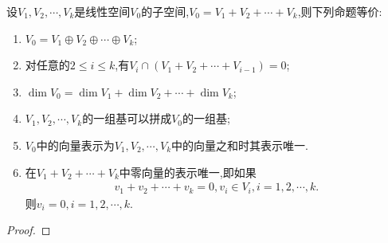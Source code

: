 \documentclass[../../main.tex]{subfiles}%
\begin{document}
\begin{theorem}[直和的等价条件]\label{theorem:直和的等价条件}
设\(V_1,V_2,\cdots,V_k\)是线性空间\(V_0\)的子空间,\(V_0 = V_1 + V_2+\cdots+V_k\),则下列命题等价:
\begin{enumerate}[(1)]
\item \label{theorem:直和的等价条件1}\(V_0 = V_1\oplus V_2\oplus\cdots\oplus V_k\);
\item \label{theorem:直和的等价条件2}对任意的\(2\leqslant  i\leqslant  k\),有\(V_i\cap(V_1 + V_2+\cdots+V_{i - 1}) = 0\);
\item \label{theorem:直和的等价条件3}\(\dim V_0=\dim V_1+\dim V_2+\cdots+\dim V_k\);
\item \label{theorem:直和的等价条件4}\(V_1,V_2,\cdots,V_k\)的一组基可以拼成\(V_0\)的一组基;
\item \label{theorem:直和的等价条件5}\(V_0\)中的向量表示为\(V_1,V_2,\cdots,V_k\)中的向量之和时其表示唯一.
\item \label{theorem:直和的等价条件6}在$ V_1 + V_2+\cdots+V_k$中零向量的表示唯一,即如果
\begin{align*}
v_1+v_2+\cdots+v_k=0,v_i\in V_i,i=1,2,\cdots,k.
\end{align*}
则$v_i=0,i=1,2,\cdots,k.$
\end{enumerate}
\end{theorem}
\begin{proof}



\end{proof}
\end{document}
